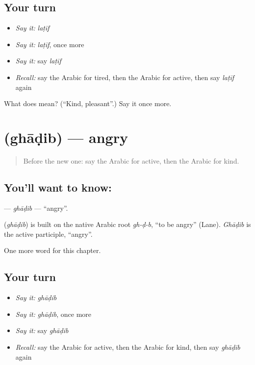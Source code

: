 \subsection*{Your turn}
\begin{itemize}
\raggedright
  \item \emph{Say it:} \emph{laṭīf}
  \item \emph{Say it:} \emph{laṭīf}, once more
  \item \emph{Say it:} say \emph{laṭīf}
  \item \emph{Recall:} say the Arabic for tired, then the Arabic for active, then say \emph{laṭīf} again
\end{itemize}

\begin{tcolorbox}[breakable,colback=teal!4,colframe=teal!35!black,title={Before you move on}]
What does  mean? (\textquotedblleft{}Kind, pleasant\textquotedblright{}.) Say it once more.
\end{tcolorbox}
\section[\texorpdfstring{\ar{غاضب} (ghāḍib)}{غاضب (ghāḍib)}]{ (ghāḍib) — angry}

\label{lesson:AR-C147-ghadib}



\begin{quote}
Before the new one: say the Arabic for active, then the Arabic for kind.
\end{quote}

\subsection*{You'll want to know: }
\textbf{} — \emph{ghāḍib} — \textquotedblleft{}angry\textquotedblright{}.

\begin{cousinweb}
\textbf{} (\emph{ghāḍib}) is built on the native Arabic root \emph{gh-ḍ-b}, \textquotedblleft{}to be angry\textquotedblright{} (Lane). \emph{Ghāḍib} is the active participle, \textquotedblleft{}angry\textquotedblright{}.
\end{cousinweb}

\begin{grammarlens}[title={What you've built}]
One more word for this chapter.
\end{grammarlens}

\subsection*{Your turn}
\begin{itemize}
\raggedright
  \item \emph{Say it:} \emph{ghāḍib}
  \item \emph{Say it:} \emph{ghāḍib}, once more
  \item \emph{Say it:} say \emph{ghāḍib}
  \item \emph{Recall:} say the Arabic for active, then the Arabic for kind, then say \emph{ghāḍib} again
\end{itemize}

